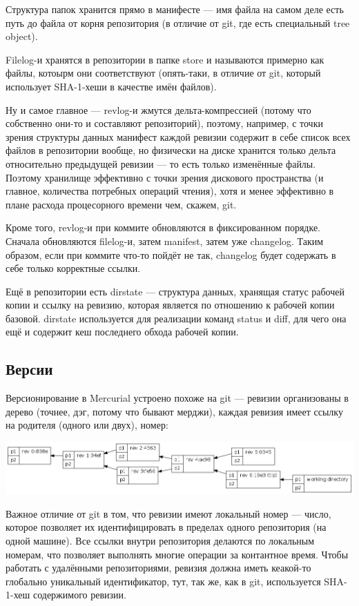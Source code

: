 \documentclass[a5paper]{article}
\begin{document}
Структура папок хранится прямо в манифесте --- имя файла на самом деле есть путь до файла от корня репозитория (в отличие от git, где есть специальный tree object).

Filelog-и хранятся в репозитории в папке store и называются примерно как файлы, котоырм они соответствуют (опять-таки, в отличие от git, который использует SHA-1-хеши в качестве имён файлов).

Ну и самое главное --- revlog-и жмутся дельта-компрессией (потому что собственно они-то и составляют репозиторий), поэтому, например, с точки зрения структуры данных манифест каждой ревизии содержит в себе список всех файлов в репозитории вообще, но физически на диске хранится только дельта относительно предыдущей ревизии --- то есть только изменённые файлы. Поэтому хранилище эффективно с точки зрения дискового пространства (и главное, количества потребных операций чтения), хотя и менее эффективно в плане расхода процесорного времени чем, скажем, git.

Кроме того, revlog-и при коммите обновляются в фиксированном порядке. Сначала обновляются filelog-и, затем manifest, затем уже changelog. Таким образом, если при коммите что-то пойдёт не так, changelog будет содержать в себе только корректные ссылки.

Ещё в репозитории есть dirstate --- структура данных, хранящая статус рабочей копии и ссылку на ревизию, которая является по отношению к рабочей копии базовой. dirstate используется для реализации команд status и diff, для чего она ещё и содержит кеш последнего обхода рабочей копии.

\subsection{Версии}

Версионирование в Mercurial устроено похоже на git --- ревизии организованы в дерево (точнее, дэг, потому что бывают мерджи), каждая ревизия имеет ссылку на родителя (одного или двух), номер:

\begin{center}
	\includegraphics[width=\textwidth]{mercurialRevisions.png}
\end{center}

Важное отличие от git в том, что ревизии имеют локальный номер --- число, которое позволяет их идентифицировать в пределах одного репозитория (на одной машине). Все ссылки внутри репозитория делаются по локальным номерам, что позволяет выполнять многие операции за контантное время. Чтобы работать с удалёнными репозиториями, ревизия должна иметь кеакой-то глобально уникальный идентификатор, тут, так же, как в git, используется SHA-1-хеш содержимого ревизии.
\end{document}
